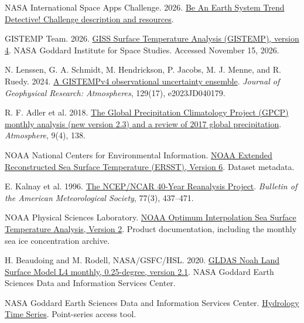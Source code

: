 \documentclass[11pt,letterpaper]{article}
\begin{document}
\clearpage
\begingroup\small
{}
\begin{thebibliography}{99}
 NASA International Space Apps Challenge. 2026.
\href{https://www.spaceappschallenge.org/2026/challenges/earth-system-trend-detective/}{Be An Earth System Trend Detective! Challenge description and resources}.

 GISTEMP Team. 2026.
\href{https://data.giss.nasa.gov/gistemp/}{GISS Surface Temperature Analysis (GISTEMP), version 4}. NASA Goddard Institute for Space Studies. Accessed November 15, 2026.

 N. Lenssen, G. A. Schmidt, M. Hendrickson, P. Jacobs, M. J. Menne, and R. Ruedy. 2024.
\href{https://doi.org/10.1029/2023JD040179}{A GISTEMPv4 observational uncertainty ensemble}. \textit{Journal of Geophysical Research: Atmospheres}, 129(17), e2023JD040179.

 R. F. Adler et al. 2018.
\href{https://doi.org/10.3390/atmos9040138}{The Global Precipitation Climatology Project (GPCP) monthly analysis (new version 2.3) and a review of 2017 global precipitation}. \textit{Atmosphere}, 9(4), 138.

 NOAA National Centers for Environmental Information.
\href{https://www.ncei.noaa.gov/access/metadata/landing-page/bin/iso?id=gov.noaa.ncdc%3AC01737}{NOAA Extended Reconstructed Sea Surface Temperature (ERSST), Version 6}. Dataset metadata.

 E. Kalnay et al. 1996.
\href{https://doi.org/10.1175/1520-0477(1996)077%3C0437:TNYRP%3E2.0.CO;2}{The NCEP/NCAR 40-Year Reanalysis Project}. \textit{Bulletin of the American Meteorological Society}, 77(3), 437--471.

 NOAA Physical Sciences Laboratory.
\href{https://psl.noaa.gov/data/gridded/data.noaa.oisst.v2.html}{NOAA Optimum Interpolation Sea Surface Temperature Analysis, Version 2}. Product documentation, including the monthly sea ice concentration archive.

 H. Beaudoing and M. Rodell, NASA/GSFC/HSL. 2020.
\href{https://doi.org/10.5067/SXAVCZFAQLNO}{GLDAS Noah Land Surface Model L4 monthly, 0.25-degree, version 2.1}. NASA Goddard Earth Sciences Data and Information Services Center.

 NASA Goddard Earth Sciences Data and Information Services Center.
\href{https://disc.gsfc.nasa.gov/information/tools?title=Hydrology%20Time%20Series}{Hydrology Time Series}. Point-series access tool.


\end{thebibliography}
\end{document}
